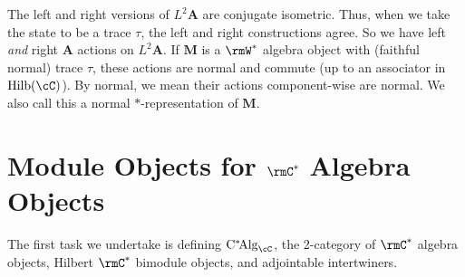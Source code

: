 \documentclass[11pt,reqno]{amsart}
\DeclareMathOperator{\Hilb}{Hilb}
\DeclareMathOperator{\CAlg}{C^*\!Alg}
\newcommand{\bb}[1]{\mathbf{#1}}
\numberwithin{equation}{section}
\theoremstyle{plain}
\begin{document}
The left and right versions of $L^2 \bb A$ are conjugate isometric.
Thus, when we take the state to be a trace $\tau$, the left and right constructions agree.
So we have left \emph{and} right $\bb A$ actions on $L^2 \bb A$.
If $\bb M$ is a $\rmW^*$ algebra object with (faithful normal) trace $\tau$, these actions are normal and commute (up to an associator in $\Hilb(\cC)$).
By normal, we mean their actions component-wise are normal.
We also call this a normal $*$-representation of $\bb M$.

\section{Module Objects for $\rmC^*$ Algebra Objects}\label{section:CModObjs}
The first task we undertake is defining $\CAlg_{\cC}$, the 2-category of $\rmC^*$ algebra objects, Hilbert $\rmC^*$ bimodule objects, and adjointable intertwiners.
\end{document}
